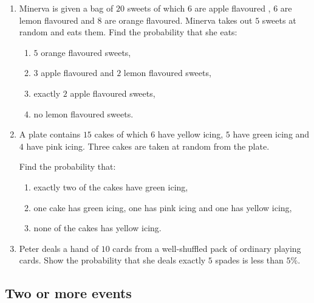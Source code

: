 \begin{enumerate}
\item  Minerva is given a bag of $20$ sweets of which $6$ are apple flavoured , $6$ are lemon flavoured and $8$ are orange flavoured. Minerva takes out $5$ sweets at random and eats them. Find the probability that she eats:
\begin{enumerate}
	\item $5$ orange flavoured sweets,
	\item $3$ apple flavoured and $2$ lemon flavoured sweets,
	\item exactly $2$ apple flavoured sweets,
	\item no lemon flavoured sweets. 
\end{enumerate}

\item  A plate contains $15$ cakes of which $6$ have yellow icing, $5$ have green icing and $4$ have pink icing.  Three cakes are taken at random from the plate.

Find the probability that:

\begin{enumerate}
	\item exactly two of the cakes have green icing,
	\item one cake has green icing, one has pink icing and one has yellow icing,
	\item none of the cakes has yellow icing.
\end{enumerate}


\item Peter deals a hand of $10$ cards from a well-shuffled pack of ordinary playing cards.	Show the probability that she deals exactly $5$ spades is less than $5\%$.







\end{enumerate}




\newpage

\subsection{Two or more events}



